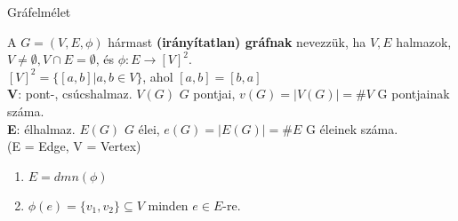\documentclass{beamer}
\newcommand{\mbigskip}{\vspace{1em}}
\begin{document}

\begin{frame}[plain]
\begin{tcolorbox}[center, colback={myyellow}, coltext={black}, colframe={myyellow}]
    {\Huge Gráfelmélet}
\end{tcolorbox}
\end{frame}


\begin{frame}

\begin{tcolorbox}[title={Gráf}]
A $G = (V, E, {\phi})$ hármast \textbf{(irányítatlan) gráfnak} nevezzük, ha $V, E$ halmazok, $V \neq \emptyset, V \cap E = \emptyset$, és $\phi : E \rightarrow [V]^2$.\\
\mbigskip
$[V]^2 = \{ [a, b] | a, b \in V \}$, ahol $[a, b] = [b, a]$\\
\mbigskip
\textbf{V}: pont-, csúcshalmaz. $V(G)$ $G$ pontjai, $v(G) = |V(G)| = \#V$ G pontjainak száma.\\
\mbigskip
\textbf{E}: élhalmaz. $E(G)$ $G$ élei, $e(G) = |E(G)| = \#E$ G éleinek száma.\\
\mbigskip
(E = Edge, V = Vertex)
\end{tcolorbox}

\begin{tcolorbox}[title={Ész}]
\begin{enumerate}
\item $E = dmn({\phi})$
\item ${\phi}(e) = \{v_1, v_2\} \subseteq V$ minden $e \in E$-re.
\end{enumerate}
\end{tcolorbox}

\end{frame}
\end{document}
